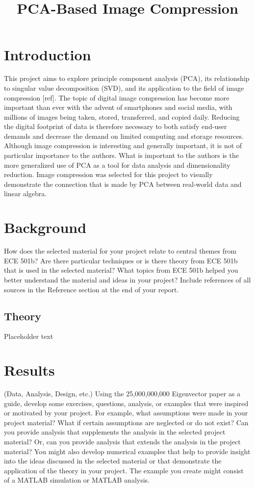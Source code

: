 \documentclass[conference]{IEEEtran}
\title{PCA-Based Image Compression}
\author{
\IEEEauthorblockN{Owen Sowatzke}
\IEEEauthorblockA{\textit{Electrical Engineering Department} \\
\textit{University of Arizona}\\
Tucson, USA \\
osowatzke@arizona.edu}
\and
\IEEEauthorblockN{Scott Thoesen}
\IEEEauthorblockA{\textit{Electrical Engineering Department} \\
\textit{University of Arizona}\\
Tucson, USA \\
thoesens@arizona.edu}}
\begin{document}
	\maketitle
	
	\section{Introduction}
	This project aims to explore principle component analysis (PCA), its relationship to singular value decomposition (SVD), and its application to the field of image compression [ref]. The topic of digital image compression has become more important than ever with the advent of smartphones and social media, with millions of images being taken, stored, transferred, and copied daily. Reducing the digital footprint of data is therefore necessary to both satisfy end-user demands and decrease the demand on limited computing and storage resources. Although image compression is interesting and generally important, it is not of particular importance to the authors. What is important to the authors is the more generalized use of PCA as a tool for data analysis and dimensionality reduction. Image compression was selected for this project to visually demonstrate the connection that is made by PCA between real-world data and linear algebra.

	\section{Background}
	How does the selected material for your project relate to central themes from
ECE 501b? Are there particular techniques or is there theory from ECE 501b that is used in the
selected material? What topics from ECE 501b helped you better understand the material and
ideas in your project? Include references of all sources in the Reference section at the end of your
report.

	\subsection{Theory}
	Placeholder text

	\section{Results}
	(Data, Analysis, Design, etc.) Using the 25,000,000,000 Eigenvector paper as a
guide, develop some exercises, questions, analysis, or examples that were inspired or motivated
by your project. For example, what assumptions were made in your project material? What if
certain assumptions are neglected or do not exist? Can you provide analysis that supplements the
analysis in the selected project material? Or, can you provide analysis that extends the analysis in
the project material? You might also develop numerical examples that help to provide insight
into the ideas discussed in the selected material or that demonstrate the application of the theory
in your project. The example you create might consist of a MATLAB simulation or MATLAB
analysis.
\end{document}
